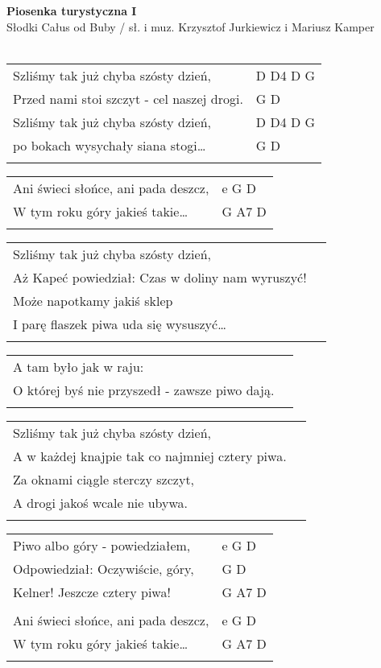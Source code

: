 \documentclass[a5paper]{article}
\begin{document}


\noindent
\fontsize{12pt}{15pt}\selectfont
\textbf{Piosenka turystyczna I} \\
\fontsize{8pt}{10pt}\selectfont
Słodki Całus od Buby / sł. i muz. Krzysztof Jurkiewicz i Mariusz Kamper \\ \\
\fontsize{10pt}{12pt}\selectfont
{}
\begin{tabular}{@{}p{9.00cm}p{3cm}@{}}
\noindent
Szliśmy tak już chyba szósty dzień,	& D D4 D G \\
Przed nami stoi szczyt - cel naszej drogi. & G D \\
Szliśmy tak już chyba szósty dzień, & D D4 D G \\                             
po bokach wysychały siana stogi… & G D \\ \\
\end{tabular}

\noindent
\begin{tabular}{@{}p{8.00cm}p{3cm}@{}}
Ani świeci słońce, ani pada deszcz, & e G D \\
W tym roku góry jakieś takie… & G A7 D \\ \\
\end{tabular}

\noindent
\begin{tabular}{@{}p{8.00cm}p{3cm}@{}}
Szliśmy tak już chyba szósty dzień, \\
Aż Kapeć powiedział: Czas w doliny nam wyruszyć! \\
Może napotkamy jakiś sklep \\
I parę flaszek piwa uda się wysuszyć… \\ \\
\end{tabular}

\noindent
\begin{tabular}{@{}p{8.00cm}p{3cm}@{}}
A tam było jak w raju: \\
O której byś nie przyszedł - zawsze piwo dają. \\ \\
\end{tabular}

\noindent
\begin{tabular}{@{}p{8.00cm}p{3cm}@{}}
Szliśmy tak już chyba szósty dzień, \\
A w każdej knajpie tak co najmniej cztery piwa. \\
Za oknami ciągle sterczy szczyt, \\
A drogi jakoś wcale nie ubywa. \\ \\
\end{tabular}

\noindent
\begin{tabular}{@{}p{8.00cm}p{3cm}@{}}
Piwo albo góry - powiedziałem, & e G D \\
Odpowiedział: Oczywiście, góry, & G D \\
Kelner! Jeszcze cztery piwa! & G A7 D \\ \\
Ani świeci słońce, ani pada deszcz, & e G D \\
W tym roku góry jakieś takie… & G A7 D \\ \\
\end{tabular}
\end{document}
